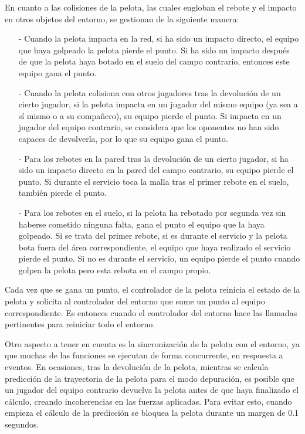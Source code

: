 En cuanto a las colisiones de la pelota, las cuales engloban el rebote y el impacto en otros objetos del entorno, se gestionan de la siguiente manera:
\begin{enumerate}
    \item[-] Cuando la pelota impacta en la red, si ha sido un impacto directo, el equipo que haya golpeado la pelota pierde el punto. Si ha sido un impacto después de que la pelota haya botado en el suelo del campo contrario, entonces este equipo gana el punto.
    \item[-] Cuando la pelota colisiona con otros jugadores tras la devolución de un cierto jugador, si la pelota impacta en un jugador del mismo equipo (ya sea a sí mismo o a su compañero), su equipo pierde el punto. Si impacta en un jugador del equipo contrario, se considera que los oponentes no han sido capaces de devolverla, por lo que su equipo gana el punto.
    \item[-] Para los rebotes en la pared tras la devolución de un cierto jugador, si ha sido un impacto directo en la pared del campo contrario, su equipo pierde el punto. Si durante el servicio toca la malla tras el primer rebote en el suelo, también pierde el punto.
    \item[-] Para los rebotes en el suelo, si la pelota ha rebotado por segunda vez sin haberse cometido ninguna falta, gana el punto el equipo que la haya golpeado. Si se trata del primer rebote, si es durante el servicio y la pelota bota fuera del área correspondiente, el equipo que haya realizado el servicio pierde el punto. Si no es durante el servicio, un equipo pierde el punto cuando golpea la pelota pero esta rebota en el campo propio.
\end{enumerate}
Cada vez que se gana un punto, el controlador de la pelota reinicia el estado de la pelota y solicita al controlador del entorno que sume un punto al equipo correspondiente. Es entonces cuando el controlador del entorno hace las llamadas pertinentes para reiniciar todo el entorno.

Otro aspecto a tener en cuenta es la sincronización de la pelota con el entorno, ya que muchas de las funciones se ejecutan de forma concurrente, en respuesta a eventos. En ocasiones, tras la devolución de la pelota, mientras se calcula predicción de la trayectoria de la pelota para el modo depuración, es posible que un jugador del equipo contrario devuelva la pelota antes de que haya finalizado el cálculo, creando incoherencias en las fuerzas aplicadas. Para evitar esto, cuando empieza el cálculo de la predicción se bloquea la pelota durante un margen de 0.1 segundos.

